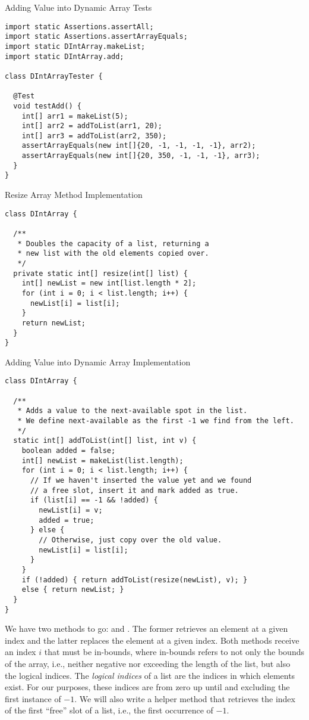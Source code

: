 \begin{cl}[]{Adding Value into Dynamic Array Tests}
\begin{lstlisting}[language=MyJava]
import static Assertions.assertAll;
import static Assertions.assertArrayEquals;
import static DIntArray.makeList;
import static DIntArray.add;

class DIntArrayTester {

  @Test
  void testAdd() {
    int[] arr1 = makeList(5);
    int[] arr2 = addToList(arr1, 20);
    int[] arr3 = addToList(arr2, 350);
    assertArrayEquals(new int[]{20, -1, -1, -1, -1}, arr2);
    assertArrayEquals(new int[]{20, 350, -1, -1, -1}, arr3);
  }
}
\end{lstlisting}
\end{cl}

\begin{cl}[]{Resize Array Method Implementation}
\begin{lstlisting}[language=MyJava]
class DIntArray {

  /**
   * Doubles the capacity of a list, returning a 
   * new list with the old elements copied over.
   */
  private static int[] resize(int[] list) {
    int[] newList = new int[list.length * 2];
    for (int i = 0; i < list.length; i++) {
      newList[i] = list[i];
    }
    return newList;
  }
}
\end{lstlisting}
\end{cl}

\begin{cl}[]{Adding Value into Dynamic Array Implementation}
\begin{lstlisting}[language=MyJava]
class DIntArray {

  /**
   * Adds a value to the next-available spot in the list.
   * We define next-available as the first -1 we find from the left.
   */
  static int[] addToList(int[] list, int v) {
    boolean added = false;
    int[] newList = makeList(list.length);
    for (int i = 0; i < list.length; i++) {
      // If we haven't inserted the value yet and we found
      // a free slot, insert it and mark added as true.
      if (list[i] == -1 && !added) {
        newList[i] = v;
        added = true;
      } else {
        // Otherwise, just copy over the old value.
        newList[i] = list[i];
      }
    }
    if (!added) { return addToList(resize(newList), v); } 
    else { return newList; }
  }
}
\end{lstlisting}
\end{cl}

We have two methods to go:  and . The former retrieves an element at a given index and the latter replaces the element at a given index. Both methods receive an index $i$ that must be in-bounds, where in-bounds refers to not only the bounds of the array, i.e., neither negative nor exceeding the length of the list, but also the logical indices. The \textit{logical indices} of a list are the indices in which elements exist. For our purposes, these indices are from zero up until and excluding the first instance of $-1$. We will also write a helper method that retrieves the index of the first ``free'' slot of a list, i.e., the first occurrence of $-1$.

